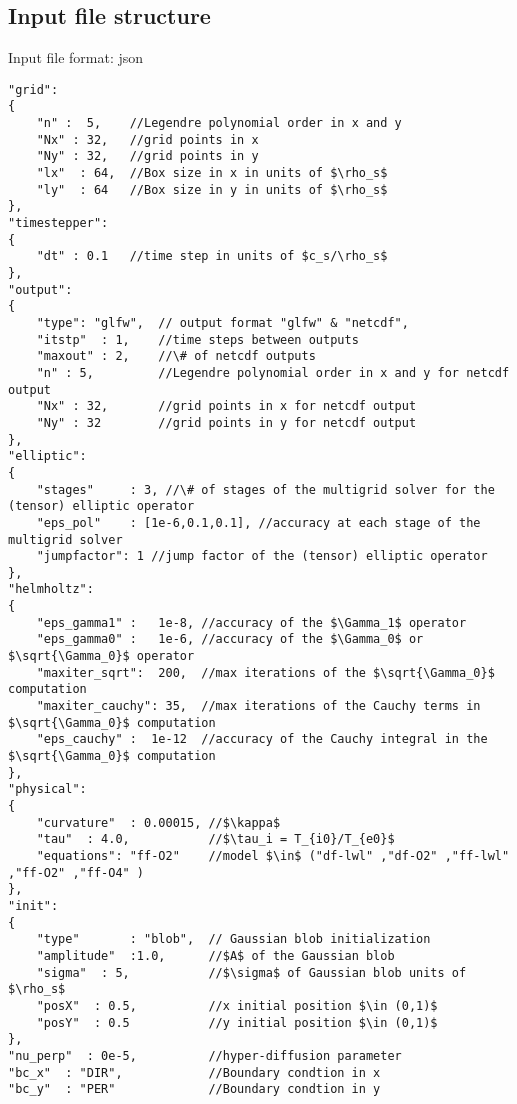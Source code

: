 \subsection{Input file structure}
Input file format: json
\begin{verbatim}
"grid":
{
    "n" :  5,    //Legendre polynomial order in x and y 
    "Nx" : 32,   //grid points in x
    "Ny" : 32,   //grid points in y
    "lx"  : 64,  //Box size in x in units of $\rho_s$
    "ly"  : 64   //Box size in y in units of $\rho_s$
},
"timestepper":
{
    "dt" : 0.1   //time step in units of $c_s/\rho_s$ 
},
"output":
{
    "type": "glfw",  // output format "glfw" & "netcdf",
    "itstp"  : 1,    //time steps between outputs
    "maxout" : 2,    //\# of netcdf outputs
    "n" : 5,         //Legendre polynomial order in x and y for netcdf output
    "Nx" : 32,       //grid points in x for netcdf output
    "Ny" : 32        //grid points in y for netcdf output
},    
"elliptic":
{
    "stages"     : 3, //\# of stages of the multigrid solver for the (tensor) elliptic operator
    "eps_pol"    : [1e-6,0.1,0.1], //accuracy at each stage of the multigrid solver
    "jumpfactor": 1 //jump factor of the (tensor) elliptic operator
},
"helmholtz":
{
    "eps_gamma1" :   1e-8, //accuracy of the $\Gamma_1$ operator
    "eps_gamma0" :   1e-6, //accuracy of the $\Gamma_0$ or $\sqrt{\Gamma_0}$ operator
    "maxiter_sqrt":  200,  //max iterations of the $\sqrt{\Gamma_0}$ computation
    "maxiter_cauchy": 35,  //max iterations of the Cauchy terms in $\sqrt{\Gamma_0}$ computation
    "eps_cauchy" :  1e-12  //accuracy of the Cauchy integral in the $\sqrt{\Gamma_0}$ computation
},
"physical":
{
    "curvature"  : 0.00015, //$\kappa$
    "tau"  : 4.0,           //$\tau_i = T_{i0}/T_{e0}$
    "equations": "ff-O2"    //model $\in$ ("df-lwl" ,"df-O2" ,"ff-lwl" ,"ff-O2" ,"ff-O4" )
},
"init":
{
    "type"       : "blob",  // Gaussian blob initialization
    "amplitude"  :1.0,      //$A$ of the Gaussian blob
    "sigma"  : 5,           //$\sigma$ of Gaussian blob units of $\rho_s$
    "posX"  : 0.5,          //x initial position $\in (0,1)$
    "posY"  : 0.5           //y initial position $\in (0,1)$
},
"nu_perp"  : 0e-5,          //hyper-diffusion parameter
"bc_x"  : "DIR",            //Boundary condtion in x
"bc_y"  : "PER"             //Boundary condtion in y
\end{verbatim}
